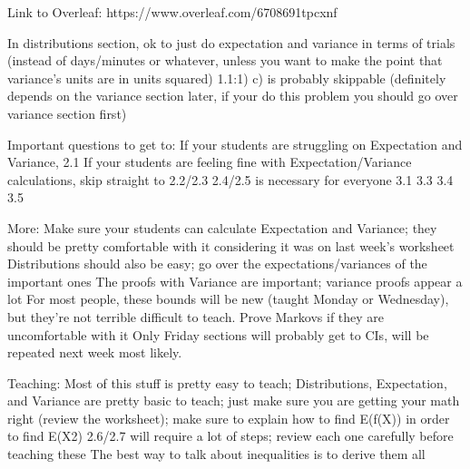 Link to Overleaf: https://www.overleaf.com/6708691tpcxnf 

In distributions section, ok to just do expectation and variance in terms of trials (instead of days/minutes or whatever, unless you want to make the point that variance’s units are in units squared)
1.1:1) c) is probably skippable (definitely depends on the variance section later, if your do this problem you should go over variance section first)

Important questions to get to:
If your students are struggling on Expectation and Variance, 2.1
If your students are feeling fine with Expectation/Variance calculations, skip straight to 2.2/2.3
2.4/2.5 is necessary for everyone
3.1
3.3
3.4
3.5

More:
Make sure your students can calculate Expectation and Variance; they should be pretty  comfortable with it considering it was on last week's worksheet
Distributions should also be easy; go over the expectations/variances of the important ones
The proofs with Variance are important; variance proofs appear a lot
For most people, these bounds will be new (taught Monday or Wednesday), but they’re not terrible difficult to teach. Prove Markovs if they are uncomfortable with it
Only Friday sections will probably get to CIs, will be repeated next week most likely. 

Teaching:
Most of this stuff is pretty easy to teach; Distributions, Expectation, and Variance are pretty basic to teach; just make sure you are getting your math right (review the worksheet); make sure to explain how to find E(f(X)) in order to find E(X2)
2.6/2.7 will require a lot of steps; review each one carefully before teaching these
The best way to talk about inequalities is to derive them all
 

